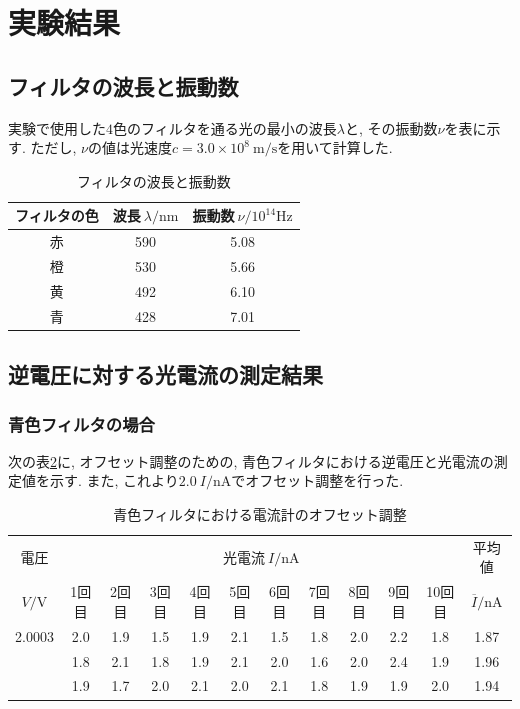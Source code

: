 \documentclass{jarticle}
\begin{document}
\section{実験結果}



\subsection{フィルタの波長と振動数}

実験で使用した$4$色のフィルタを通る光の最小の波長$\lambda$と, その振動数$\nu$を表に示す.
ただし, $\nu$の値は光速度$c = 3.0\times 10^8\ \mathrm{m/s}$を用いて計算した.

\begin{table}[H]
  \centering
  \caption{フィルタの波長と振動数}
  \label{tb:wavelength-frequency}
  \begin{tabular}{ccc}
    \hline
    フィルタの色 & 波長$\ \lambda/\mathrm{nm}$ & 振動数$\ \nu/10^{14}\mathrm{Hz}$ \\
    \hline
    赤 & 590 & 5.08 \\
    橙 & 530 & 5.66 \\
    黄 & 492 & 6.10 \\
    青 & 428 & 7.01 \\
    \hline
  \end{tabular}
\end{table}



\subsection{逆電圧に対する光電流の測定結果}



\subsubsection{青色フィルタの場合}

次の表\ref{tb:blue-filter-offset}に, オフセット調整のための, 青色フィルタにおける逆電圧と光電流の測定値を示す.
また, これより$2.0\ I/\mathrm{nA}$でオフセット調整を行った.

\begin{table}[H]
  \caption{青色フィルタにおける電流計のオフセット調整}
  \label{tb:blue-filter-offset}
  \hspace{-2.5cm}
  \begin{tabular}{cccccccccccc}
    \hline
    電圧 & \multicolumn{10}{c}{光電流$\ I/\mathrm{nA}$} & 平均値 \\
    $V/\mathrm{V}$ & 1回目 & 2回目 & 3回目 & 4回目 & 5回目 & 6回目 & 7回目 & 8回目 & 9回目 & 10回目 & $\overline{I}/\mathrm{nA}$ \\
    \hline
    2.0003 & 2.0 & 1.9 & 1.5 & 1.9 & 2.1 & 1.5 & 1.8 & 2.0 & 2.2 & 1.8 & 1.87 \\
    & 1.8 & 2.1 & 1.8 & 1.9 & 2.1 & 2.0 & 1.6 & 2.0 & 2.4 & 1.9 & 1.96 \\
    & 1.9 & 1.7 & 2.0 & 2.1 & 2.0 & 2.1 & 1.8 & 1.9 & 1.9 & 2.0 & 1.94 \\
    \hline
  \end{tabular}
\end{table}
\end{document}
